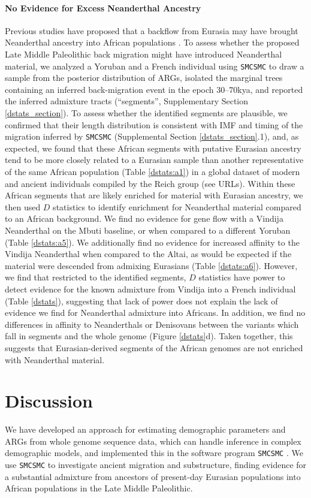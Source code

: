 \documentclass{article}
\begin{document}
\paragraph{No Evidence for Excess Neanderthal Ancestry} Previous studies have proposed that a backflow from Eurasia may have brought Neanderthal ancestry into African populations \cite{Chen2020}. To assess whether the proposed Late Middle Paleolithic back migration might have introduced Neanderthal material, we analyzed a Yoruban and a French individual using {\tt SMCSMC} to draw a sample from the posterior distribution of ARGs, isolated the marginal trees containing an inferred back-migration event in the epoch $30$--$70$kya, and reported the inferred admixture tracts (``segments'', Supplementary Section \ref{dstats_section}). To assess whether the identified segments are plausible, we confirmed that their length distribution is consistent with IMF and timing of the migration inferred by {\tt SMCSMC} (Supplemental Section \ref{dstats_section}.1), and, as expected, we found that these African segments with putative Eurasian ancestry tend to be more closely related to a Eurasian sample than another representative of the same African population (Table \ref{dstats:a1}) in a global dataset of modern and ancient individuals compiled by the Reich group (see URLs). Within these African segments that are likely enriched for material with Eurasian ancestry, we then used $D$ statistics \cite{Patterson2012} to identify enrichment for Neanderthal material compared to an African background. We find no evidence for gene flow with a Vindija Neanderthal on the Mbuti baseline, or when compared to a different Yoruban (Table \ref{dstats:a5}). We additionally find no evidence for increased affinity to the Vindija Neanderthal when compared to the Altai, as would be expected if the material were descended from admixing Eurasians (Table \ref{dstats:a6}). However, we find that restricted to the identified segments, $D$ statistics have power to detect evidence for the known admixture from Vindija into a French individual (Table \ref{dstats}), suggesting that lack of power does not explain the lack of evidence we find for Neanderthal admixture into Africans.  In addition, we find no differences in affinity to Neanderthals or Denisovans between the variants which fall in segments and the whole genome (Figure \ref{dstats}d). Taken together, this suggests that Eurasian-derived segments of the African genomes are not enriched with Neanderthal material.

\section{Discussion}
We have developed an approach for estimating demographic parameters and ARGs from whole genome sequence data, which can handle inference in complex demographic models, and implemented this in the software program {\tt SMCSMC} \cite{Henderson2018}. We use {\tt SMCSMC} to investigate ancient migration and substructure, finding evidence for a substantial admixture from ancestors of present-day Eurasian populations into African populations in the Late Middle Paleolithic.
\end{document}
